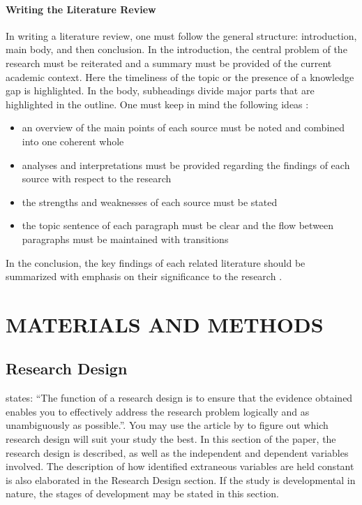 \documentclass{strrespaper-trad}
\begin{document}
		\paragraph{Writing the Literature Review}
			In writing a literature review, one must follow the general structure: introduction, main body, and then conclusion.
			In the introduction, the central problem of the research must be reiterated and a summary must be provided of the current academic context.
			Here the timeliness of the topic or the presence of a knowledge gap is highlighted.
			In the body, subheadings divide major parts that are highlighted in the outline.
			One must keep in mind the following ideas \autocite{mccombesLiteratureReviewComplete2019}:
			\begin{itemize}
				\item an overview of the main points of each source must be noted and combined into one coherent whole
				\item analyses and interpretations must be provided regarding the findings of each source with respect to the research
				\item the strengths and weaknesses of each source must be stated
				\item the topic sentence of each paragraph must be clear and the flow between paragraphs must be maintained with transitions
			\end{itemize}
			In the conclusion, the key findings of each related literature should be summarized with emphasis on their significance to the research \autocite{mccombesLiteratureReviewComplete2019}.

	\section{MATERIALS AND METHODS}
		\subsection{Research Design}
			\textcite{labareeTypesResearchDesigns2020} states: \enquote{The function of a research design is to ensure that the evidence obtained enables you to effectively address the research problem logically and as unambiguously as possible.}.
			You may use the article by \textcite{labareeTypesResearchDesigns2020} to figure out which research design will suit your study the best.
			In this section of the paper, the research design is described, as well as the independent and dependent variables involved.
			The description of how identified extraneous variables are held constant is also elaborated in the Research Design section.
			If the study is developmental in nature, the stages of development may be stated in this section.
\end{document}
